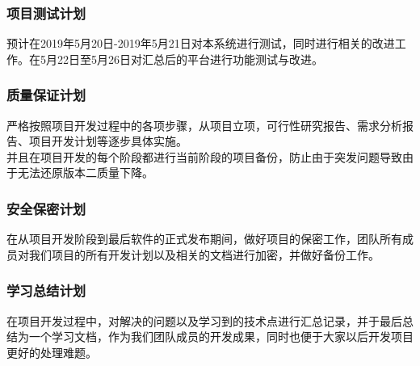 \documentclass[
]{article}
\begin{document}
\hypertarget{header-n3736}{%
\subsubsection{项目测试计划}\label{header-n3736}}

预计在2019年5月20日-2019年5月21日对本系统进行测试，同时进行相关的改进工作。在5月22日至5月26日对汇总后的平台进行功能测试与改进。

\hypertarget{header-n3738}{%
\subsubsection{质量保证计划}\label{header-n3738}}

严格按照项目开发过程中的各项步骤，从项目立项，可行性研究报告、需求分析报告、项目开发计划等逐步具体实施。\\
并且在项目开发的每个阶段都进行当前阶段的项目备份，防止由于突发问题导致由于无法还原版本二质量下降。

\hypertarget{header-n3740}{%
\subsubsection{安全保密计划}\label{header-n3740}}

在从项目开发阶段到最后软件的正式发布期间，做好项目的保密工作，团队所有成员对我们项目的所有开发计划以及相关的文档进行加密，并做好备份工作。

\hypertarget{header-n3742}{%
\subsubsection{学习总结计划}\label{header-n3742}}

在项目开发过程中，对解决的问题以及学习到的技术点进行汇总记录，并于最后总结为一个学习文档，作为我们团队成员的开发成果，同时也便于大家以后开发项目更好的处理难题。
\end{document}
